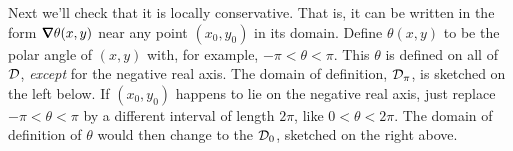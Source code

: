 Next we'll check that it is locally conservative. That is, it can be written
in the form $\vnabla\theta(x,y)$ near any point $(x_0,y_0)$ in its domain. 
Define $\theta(x,y)$ to be the polar angle of $(x,y)$ with, for example,
$-\pi<\theta<\pi$. This $\theta$ is defined on all of $\mathcal{D}$, 
\emph{except} for the negative real axis. The domain of definition, 
$\mathcal{D}_\pi$, is sketched on the left below.%
If $(x_0,y_0)$ happens to lie on the negative real
axis, just replace $-\pi<\theta<\pi$ by a different interval of length $2\pi$,
like $0<\theta<2\pi$.  The domain of definition of $\theta$ would then change
to the $\mathcal{D}_0$, sketched on the right above.


